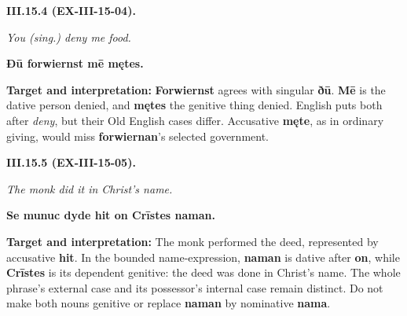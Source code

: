 \par\begin{minipage}{\linewidth}\raggedright
\textbf{III.15.4 (EX-III-15-04).}

\emph{You (sing.) deny me food.}

\textbf{Ðū forwiernst mē mętes.}

\textbf{Target and interpretation:} \textbf{Forwiernst} agrees with singular \textbf{ðū}. \textbf{Mē} is the dative person denied, and \textbf{mętes} the genitive thing denied. English puts both after \emph{deny}, but their Old English cases differ. Accusative \textbf{męte}, as in ordinary giving, would miss \textbf{forwiernan}'s selected government.

\end{minipage}\par\addvspace{4pt}

\par\begin{minipage}{\linewidth}\raggedright
\textbf{III.15.5 (EX-III-15-05).}

\emph{The monk did it in Christ’s name.}

\textbf{Se munuc dyde hit on Crīstes naman.}

\textbf{Target and interpretation:} The monk performed the deed, represented by accusative \textbf{hit}. In the bounded name-expression, \textbf{naman} is dative after \textbf{on}, while \textbf{Crīstes} is its dependent genitive: the deed was done in Christ's name. The whole phrase's external case and its possessor's internal case remain distinct. Do not make both nouns genitive or replace \textbf{naman} by nominative \textbf{nama}.

\end{minipage}\par\addvspace{4pt}

